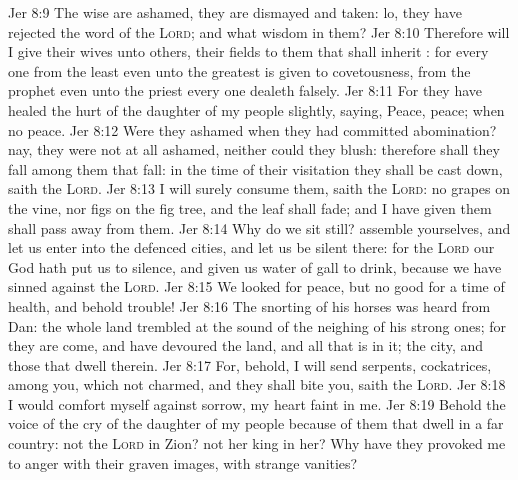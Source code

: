 \vs Jer 8:9 The wise  are ashamed, they are dismayed and taken: lo, they have rejected the word of the \textsc{Lord}; and what wisdom  in them?
\vs Jer 8:10 Therefore will I give their wives unto others,  their fields to them that shall inherit : for every one from the least even unto the greatest is given to covetousness, from the prophet even unto the priest every one dealeth falsely.
\vs Jer 8:11 For they have healed the hurt of the daughter of my people slightly, saying, Peace, peace; when  no peace.
\vs Jer 8:12 Were they ashamed when they had committed abomination? nay, they were not at all ashamed, neither could they blush: therefore shall they fall among them that fall: in the time of their visitation they shall be cast down, saith the \textsc{Lord}.
\vs Jer 8:13 I will surely consume them, saith the \textsc{Lord}:  no grapes on the vine, nor figs on the fig tree, and the leaf shall fade; and  I have given them shall pass away from them.
\vs Jer 8:14 Why do we sit still? assemble yourselves, and let us enter into the defenced cities, and let us be silent there: for the \textsc{Lord} our God hath put us to silence, and given us water of gall to drink, because we have sinned against the \textsc{Lord}.
\vs Jer 8:15 We looked for peace, but no good  for a time of health, and behold trouble!
\vs Jer 8:16 The snorting of his horses was heard from Dan: the whole land trembled at the sound of the neighing of his strong ones; for they are come, and have devoured the land, and all that is in it; the city, and those that dwell therein.
\vs Jer 8:17 For, behold, I will send serpents, cockatrices, among you, which  not  charmed, and they shall bite you, saith the \textsc{Lord}.
\vs Jer 8:18  I would comfort myself against sorrow, my heart  faint in me.
\vs Jer 8:19 Behold the voice of the cry of the daughter of my people because of them that dwell in a far country:  not the \textsc{Lord} in Zion?  not her king in her? Why have they provoked me to anger with their graven images,  with strange vanities?
